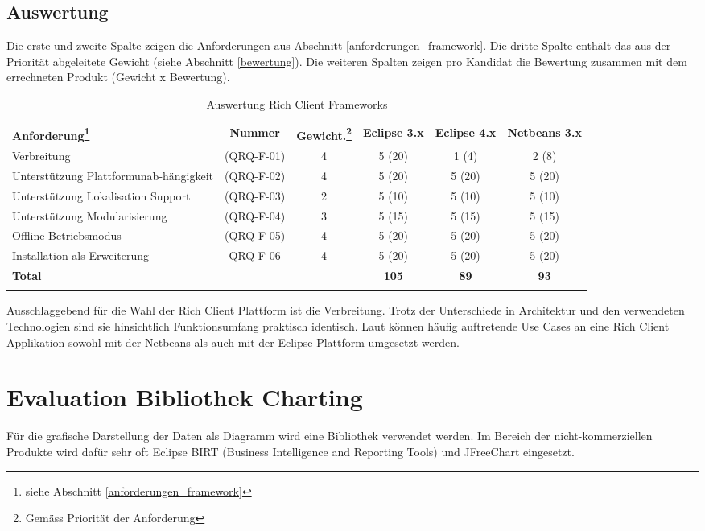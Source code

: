 \subsection{Auswertung}
Die erste und zweite Spalte zeigen die Anforderungen aus Abschnitt \ref{anforderungen_framework}. Die dritte Spalte enthält das aus der Priorität abgeleitete Gewicht (siehe Abschnitt \ref{bewertung}). Die weiteren Spalten zeigen pro Kandidat die Bewertung zusammen mit dem errechneten Produkt (Gewicht x Bewertung).
\begin{longtable}{|p{3cm}|c|c|c|c|c|}\hline
 \textbf{Anforderung\footnote{siehe Abschnitt \ref{anforderungen_framework}}} & \textbf{Nummer} &  \textbf{Gewicht.\footnote{Gemäss Priorität der Anforderung}} & \textbf{Eclipse 3.x} & \textbf{Eclipse 4.x} &  \textbf{Netbeans 3.x}\\\hline
   Verbreitung & (QRQ-F-01) & 4 & 5 (20) & 1 (4) & 2 (8)\\\hline
   Unterstützung Plattformunab-hängigkeit & (QRQ-F-02) & 4 & 5 (20) & 5 (20) & 5 (20)\\\hline
   Unterstützung Lokalisation Support & (QRQ-F-03) & 2 & 5 (10) & 5 (10) & 5 (10) \\\hline
   Unterstützung Modularisierung & (QRQ-F-04) & 3 & 5 (15) & 5 (15) & 5 (15) \\\hline
   Offline Betriebsmodus & (QRQ-F-05) & 4 & 5 (20) & 5 (20) & 5 (20) \\\hline
   Installation als Erweiterung & QRQ-F-06 & 4 & 5 (20) & 5 (20) & 5 (20) \\\hline
   \textbf{Total} & & & \textbf{105} & \textbf{89} & \textbf{93}\\\hline
    \caption{Auswertung Rich Client Frameworks}
\end{longtable}

Ausschlaggebend für die Wahl der Rich Client Plattform ist die Verbreitung. Trotz der Unterschiede in Architektur und den verwendeten Technologien sind sie hinsichtlich Funktionsumfang praktisch identisch. Laut \cite{toedter20071120} können häufig auftretende Use Cases an eine Rich Client Applikation sowohl mit der Netbeans als auch mit der Eclipse Plattform umgesetzt werden.


\section{Evaluation Bibliothek Charting}
Für die grafische Darstellung der Daten als Diagramm wird eine Bibliothek verwendet werden. Im Bereich der nicht-kommerziellen Produkte wird dafür sehr oft Eclipse BIRT (Business Intelligence and Reporting Tools) und JFreeChart eingesetzt.
